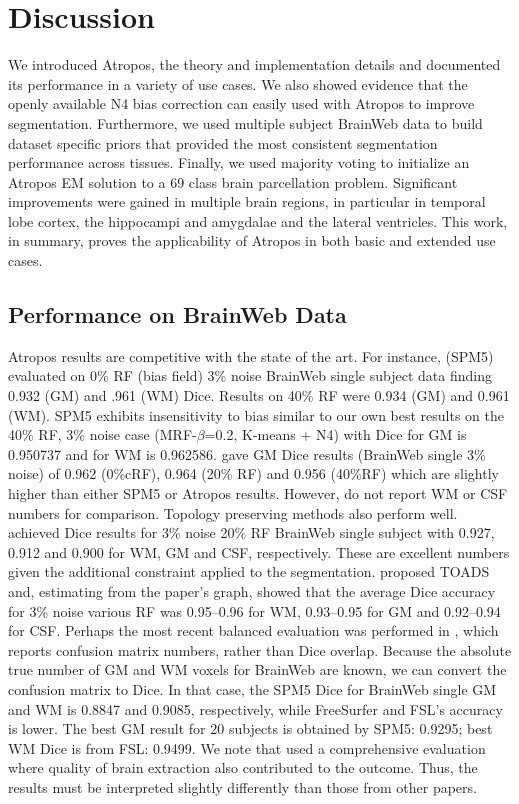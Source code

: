 \documentclass[11pt,english]{article}
\begin{document}
\section{Discussion}
We introduced Atropos, the theory and implementation
details and documented its performance in a variety of use cases.  We
also showed evidence that the openly available N4 bias correction can easily used with Atropos to improve segmentation.
Furthermore, we used multiple subject BrainWeb data to build dataset
specific priors that provided the most consistent segmentation
performance across tissues.  Finally, we used majority voting to
initialize an Atropos EM solution to a 69 class brain parcellation
problem.  Significant improvements were gained in multiple brain
regions, in particular in temporal lobe cortex, the hippocampi and
amygdalae and the lateral ventricles.  This work, in summary, proves
the applicability of Atropos in both basic and extended use cases.

\subsection{Performance on BrainWeb Data}
Atropos results are competitive with the state of the art.  For
instance, \cite{Ashburner2005} (SPM5) evaluated on 0\% RF (bias field) 3\%
noise BrainWeb single subject data finding 0.932 (GM) and .961 (WM)
Dice. Results on 40\% RF were 0.934 (GM) and 0.961 (WM). SPM5 exhibits
insensitivity to bias similar to our own best results on the 40\% RF, 3\% 
noise case (MRF-$\beta$=0.2, K-means $+$ N4) with Dice for GM is
0.950737 and for WM is 0.962586.  \cite{Nakamura2009} gave GM Dice
results (BrainWeb single 3\% noise) of 0.962 (0\%cRF), 0.964 (20\% RF)
and 0.956 (40\%RF) which are slightly higher than either SPM5 or Atropos
results.  However, \cite{Nakamura2009} do not report WM or CSF numbers
for comparison.  Topology preserving methods also perform well.
\cite{Shiee2010} achieved Dice results for 3\% noise 20\% RF BrainWeb
single subject with 0.927, 0.912 and 0.900 for WM, GM and CSF,
respectively.  These are excellent numbers given the additional
constraint applied to the segmentation.  
\cite{Bazin2007c} proposed TOADS and, estimating from the
paper's graph, showed that the average Dice accuracy for 3\% noise various RF was
0.95--0.96 for WM, 0.93--0.95 for GM and 0.92--0.94 for CSF.
Perhaps the most recent balanced evaluation was performed in
\citep{Klauschen2009}, which reports confusion matrix numbers, rather
than Dice overlap.  Because the absolute true number of GM and WM
voxels for BrainWeb are known, we can convert the confusion matrix to
Dice.  In that case, the SPM5 Dice for BrainWeb single GM and WM is 0.8847
and 0.9085, respectively, while FreeSurfer and FSL's accuracy is
lower. The best GM result for 20 subjects is obtained by SPM5: 0.9295;
best WM Dice is from FSL: 0.9499.  We note that \cite{Klauschen2009}
used a comprehensive evaluation where quality of brain extraction also
contributed to the outcome.  Thus, the results must be interpreted
slightly differently than those from other papers.  
\end{document}

